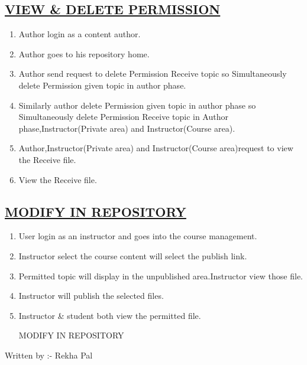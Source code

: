 \documentclass{article}
\begin{document}
\subsection*{\underline{VIEW \& DELETE PERMISSION}}
\begin{enumerate}
\item Author login as a content author.
\item Author goes to his repository home.
\item Author send request to delete Permission Receive topic so Simultaneously delete Permission given topic in author phase.
\item Similarly author delete Permission given topic in author phase so Simultaneously delete Permission Receive topic in Author phase,Instructor(Private area) and Instructor(Course area).
\item Author,Instructor(Private area) and Instructor(Course area)request to view the Receive file.
\item View the Receive file.
\end{enumerate} 
\subsection*{\underline{MODIFY IN REPOSITORY}}
\begin{enumerate}
\item User login as an instructor and goes into the course management.
\item Instructor select the course content will select the publish link.
\item Permitted topic will display in the unpublished area.Instructor view those file.
\item Instructor will publish the selected files.
\item Instructor \& student both view the permitted file.
\begin{center}

{MODIFY IN REPOSITORY}
\label{figure:modify_rep.latex}
\end{center}
\end{enumerate}
Written by :- Rekha Pal                                                   
\end{document}
